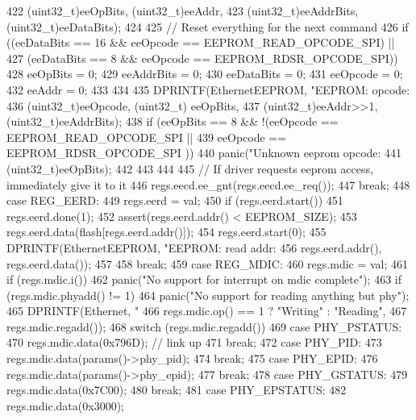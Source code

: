 \begin{DoxyCode}
{{{422                       (uint32_t)eeOpBits, (uint32_t)eeAddr,
423                       (uint32_t)eeAddrBits, (uint32_t)eeDataBits);
424 
425             // Reset everything for the next command
426             if ((eeDataBits == 16 && eeOpcode == EEPROM_READ_OPCODE_SPI) ||
427                 (eeDataBits == 8 && eeOpcode == EEPROM_RDSR_OPCODE_SPI)) {
428                 eeOpBits = 0;
429                 eeAddrBits = 0;
430                 eeDataBits = 0;
431                 eeOpcode = 0;
432                 eeAddr = 0;
433             }
434 
435             DPRINTF(EthernetEEPROM, "EEPROM: opcode: %
436                     (uint32_t)eeOpcode, (uint32_t) eeOpBits,
437                     (uint32_t)eeAddr>>1, (uint32_t)eeAddrBits);
438             if (eeOpBits == 8 && !(eeOpcode == EEPROM_READ_OPCODE_SPI ||
439                                    eeOpcode == EEPROM_RDSR_OPCODE_SPI ))
440                 panic("Unknown eeprom opcode: %
441                       (uint32_t)eeOpBits);
442 
443 
444         }
445         // If driver requests eeprom access, immediately give it to it
446         regs.eecd.ee_gnt(regs.eecd.ee_req());
447         break;
448       case REG_EERD:
449         regs.eerd = val;
450         if (regs.eerd.start()) {
451             regs.eerd.done(1);
452             assert(regs.eerd.addr() < EEPROM_SIZE);
453             regs.eerd.data(flash[regs.eerd.addr()]);
454             regs.eerd.start(0);
455             DPRINTF(EthernetEEPROM, "EEPROM: read addr: %
456                     regs.eerd.addr(), regs.eerd.data());
457         }
458         break;
459       case REG_MDIC:
460         regs.mdic = val;
461         if (regs.mdic.i())
462             panic("No support for interrupt on mdic complete\n");
463         if (regs.mdic.phyadd() != 1)
464             panic("No support for reading anything but phy\n");
465         DPRINTF(Ethernet, "%
466                 regs.mdic.op() == 1 ? "Writing" : "Reading",
467                 regs.mdic.regadd());
468         switch (regs.mdic.regadd()) {
469           case PHY_PSTATUS:
470             regs.mdic.data(0x796D); // link up
471             break;
472           case PHY_PID:
473             regs.mdic.data(params()->phy_pid);
474             break;
475           case PHY_EPID:
476             regs.mdic.data(params()->phy_epid);
477             break;
478           case PHY_GSTATUS:
479             regs.mdic.data(0x7C00);
480             break;
481           case PHY_EPSTATUS:
482             regs.mdic.data(0x3000);
}}}
\end{DoxyCode}
